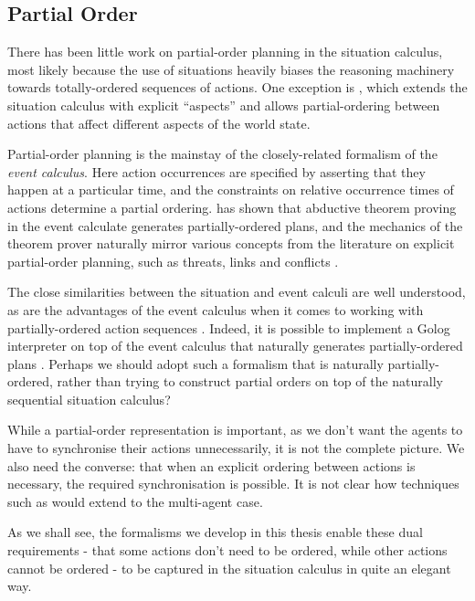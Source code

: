 \subsection{Partial Order}

There has been little work on partial-order planning in the situation
calculus, most likely because the use of situations heavily biases
the reasoning machinery towards totally-ordered sequences of actions.
One exception is \citep{plaisted97sc_aspect}, which extends the situation
calculus with explicit {}``aspects'' and allows partial-ordering
between actions that affect different aspects of the world state.

Partial-order planning is the mainstay of the closely-related formalism
of the \emph{event calculus}. Here action occurrences are specified
by asserting that they happen at a particular time, and the constraints
on relative occurrence times of actions determine a partial ordering.
\citet{Shanahan97ec_planning} has shown that abductive theorem proving
in the event calculate generates partially-ordered plans, and the
mechanics of the theorem prover naturally mirror various concepts
from the literature on explicit partial-order planning, such as threats,
links and conflicts \citep{peot92conditional_nonlinear}.

The close similarities between the situation and event calculi are
well understood, as are the advantages of the event calculus when
it comes to working with partially-ordered action sequences \citep{belleghem97sitcalc_evtcalc}.
Indeed, it is possible to implement a Golog interpreter on top of
the event calculus that naturally generates partially-ordered plans
\citep{pereira04ec_golog}. Perhaps we should adopt such a formalism
that is naturally partially-ordered, rather than trying to construct
partial orders on top of the naturally sequential situation calculus?

While a partial-order representation is important, as we don't want
the agents to have to synchronise their actions unnecessarily, it
is not the complete picture. We also need the converse: that when
an explicit ordering between actions is necessary, the required synchronisation
is possible. It is not clear how techniques such as \citep{pereira04ec_golog}
would extend to the multi-agent case.

As we shall see, the formalisms we develop in this thesis enable these
dual requirements - that some actions don't need to be ordered, while
other actions cannot be ordered - to be captured in the situation
calculus in quite an elegant way.


